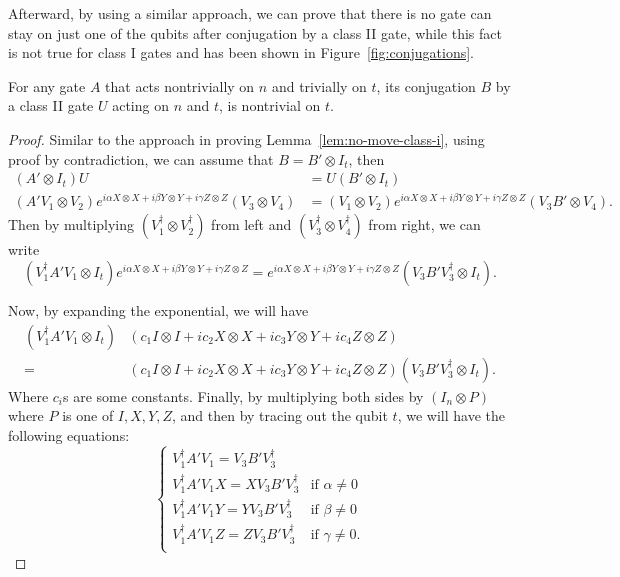 Afterward, by using a similar approach, we can prove that there is no gate can stay on just one of the qubits after conjugation by a class II gate, while this fact is not true for class I gates and has been shown in Figure~\ref{fig:conjugations}.

\begin{lemma}\label{lem:no-trivial-commutation}
  For any gate $A$ that acts nontrivially on $n$ and trivially on $t$, its conjugation $B$ by a class II gate $U$ acting on $n$ and $t$, is nontrivial on $t$. 
\end{lemma}
\begin{proof}
  Similar to the approach in proving Lemma~\ref{lem:no-move-class-i}, using proof by contradiction, we can assume that $B = B' \otimes I_t$, then
  \begin{equation}
    \begin{aligned}
      (A' \otimes I_t) U  &= U (B' \otimes I_t) \\
      (A' V_1 \otimes V_2) e^{i \alpha X \otimes X + i \beta Y \otimes Y + i \gamma Z \otimes Z} (V_3 \otimes V_4) &= (V_1 \otimes V_2) e^{i \alpha X \otimes X + i \beta Y \otimes Y + i \gamma Z \otimes Z} (V_3 B' \otimes V_4). 
    \end{aligned}
  \end{equation}
  Then by multiplying $(V_1^\dagger \otimes V_2^\dagger)$ from left and $(V_3^\dagger \otimes V_4^\dagger)$ from right, we can write
  \begin{equation}
      (V_1^\dagger A' V_1 \otimes I_t) e^{i \alpha X \otimes X + i \beta Y \otimes Y + i \gamma Z \otimes Z} = e^{i \alpha X \otimes X + i \beta Y \otimes Y + i \gamma Z \otimes Z} (V_3 B' V_3^\dagger \otimes I_t).
  \end{equation}

  Now, by expanding the exponential, we will have
  \begin{equation}
    \begin{aligned}
      (V_1^\dagger A' V_1 \otimes I_t) & (c_1 I \otimes I + i c_2 X \otimes X + i c_3 Y \otimes Y + i c_4 Z \otimes Z) \\
      = &(c_1 I \otimes I + i c_2 X \otimes X + i c_3 Y \otimes Y + i c_4 Z \otimes Z) (V_3 B' V_3^\dagger \otimes I_t).  
    \end{aligned}
  \end{equation}
  Where $c_i$s are some constants. Finally, by multiplying both sides by $(I_n \otimes P)$ where $P$ is one of $I, X, Y, Z$, and then by tracing out the qubit $t$, we will have the following equations:
  \begin{equation}
    \begin{cases}
      V_1^\dagger A' V_1 = V_3 B' V_3^\dagger \\
      V_1^\dagger A' V_1 X = X V_3 B' V_3^\dagger & \text{if }\alpha \ne 0 \\
      V_1^\dagger A' V_1 Y = Y V_3 B' V_3^\dagger & \text{if }\beta \ne 0 \\
      V_1^\dagger A' V_1 Z = Z V_3 B' V_3^\dagger & \text{if }\gamma \ne 0. \\
    \end{cases}
  \end{equation}


\end{proof}
